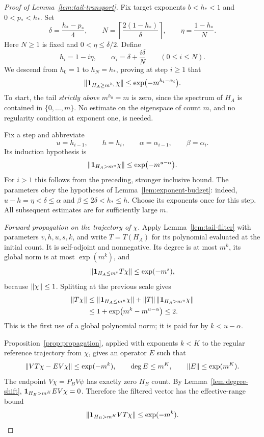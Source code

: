 \begin{proof}[Proof of Lemma~\ref{lem:tail-transport}]
Fix target exponents $b<h_*<1$ and $0<p_*<h_*$.  Set
\[
 \delta=\frac{h_*-p_*}{4},
 \qquad
 N=\left\lceil\frac{2(1-h_*)}{\delta}\right\rceil,
 \qquad \eta=\frac{1-h_*}{N}.
\]
Here $N\ge1$ is fixed and $0<\eta\le\delta/2$.  Define
\[
 h_i=1-i\eta,
 \qquad \alpha_i=\delta+\frac{i\delta}{N}
 \qquad (0\le i\le N).
\]
We descend from $h_0=1$ to $h_N=h_*$, proving at step $i\ge1$ that
\[
 \lVert\mathbf 1_{H_A\ge m^{h_i}}\chi\rVert
 \le\exp\bigl(-m^{h_i-\alpha_i}\bigr).
\]
To start, the tail \emph{strictly above} $m^{h_0}=m$ is zero,
since the spectrum of $H_A$ is contained in $\{0,\ldots,m\}$.
No estimate on the eigenspace of count $m$, and no regularity condition
at exponent one, is needed.

Fix a step and abbreviate
\[
 u=h_{i-1},\qquad h=h_i,\qquad
 \alpha=\alpha_{i-1},\qquad \beta=\alpha_i.
\]
Its induction hypothesis is
\[
 \lVert\mathbf 1_{H_A>m^u}\chi\rVert
 \le\exp\bigl(-m^{u-\alpha}\bigr).
\]
For $i>1$ this follows from the preceding, stronger inclusive bound.
The parameters obey the hypotheses of Lemma~\ref{lem:exponent-budget}:
indeed, $u-h=\eta<\delta\le\alpha$ and
$\beta\le2\delta<h_*\le h$.  Choose its exponents once for this
step.  All subsequent estimates are for sufficiently large $m$.

\emph{Forward propagation on the trajectory of $\chi$.}
Apply Lemma~\ref{lem:tail-filter} with parameters $v,h,u,s,k$, and
write $T=T(H_A)$ for its polynomial evaluated at the initial count.
It is self-adjoint and nonnegative.  Its degree is at most $m^k$,
its global norm is at most $\exp(m^k)$, and
\[
 \lVert\mathbf 1_{H_A\le m^v}T\chi\rVert\le\exp(-m^s),
\]
because $\lVert\chi\rVert\le1$.  Splitting at the previous scale gives
\begin{align*}
 \lVert T\chi\rVert
 &\le \lVert\mathbf 1_{H_A\le m^u}\chi\rVert
       +\lVert T\rVert\,\lVert\mathbf 1_{H_A>m^u}\chi\rVert\\
 &\le 1+\exp\bigl(m^k-m^{u-\alpha}\bigr)
 \le2.
\end{align*}
This is the first use of a global polynomial norm; it is paid for by
$k<u-\alpha$.

Proposition~\ref{prop:propagation}, applied with exponents $k<K$ to
the regular reference trajectory from $\chi$, gives an operator $E$
such that
\[
 \lVert VT\chi-EV\chi\rVert\le\exp(-m^k),
 \qquad \deg E\le m^K,
 \qquad \lVert E\rVert\le\exp(m^K).
\]
The endpoint $V\chi=P_BV\psi$ has exactly zero $H_B$ count.
By Lemma~\ref{lem:degree-shift},
$\mathbf 1_{H_B>m^K}EV\chi=0$.  Therefore the filtered vector has the
effective-range bound
\[
 \lVert\mathbf 1_{H_B>m^K}VT\chi\rVert\le\exp(-m^k).
\]


\end{proof}

